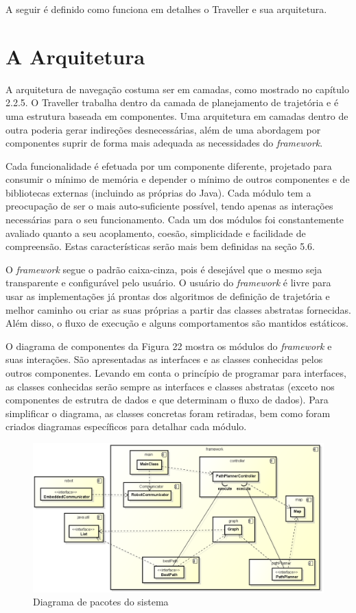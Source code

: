 A seguir é definido como funciona em detalhes o Traveller e sua arquitetura.

\section{A Arquitetura}

A arquitetura de navegação costuma ser em camadas, como mostrado no capítulo 2.2.5. O Traveller trabalha dentro da camada de planejamento de trajetória e é uma estrutura baseada em componentes. Uma arquitetura em camadas dentro de outra poderia gerar indireções desnecessárias, além de uma abordagem por componentes suprir de forma mais adequada as necessidades do \textit{framework}.

Cada funcionalidade é efetuada por um componente diferente, projetado para consumir o mínimo de memória e depender o mínimo de outros componentes e de bibliotecas externas (incluindo as próprias do Java). Cada módulo tem a preocupação de ser o mais auto-suficiente possível, tendo apenas as interações necessárias para o seu funcionamento. Cada um dos módulos foi constantemente avaliado quanto a seu acoplamento, coesão,  simplicidade e facilidade de compreensão. Estas características serão mais bem definidas na seção 5.6.

O \textit{framework} segue o padrão caixa-cinza, pois é desejável que o mesmo seja transparente e configurável pelo usuário. O usuário do \textit{framework} é livre para usar as implementações já prontas dos algoritmos de definição de trajetória e melhor caminho ou criar as suas próprias a partir das classes abstratas fornecidas. Além disso, o fluxo de execução e alguns comportamentos são mantidos estáticos.

O diagrama de componentes da Figura 22 mostra os módulos do \textit{framework} e suas interações. São apresentadas as interfaces e as classes conhecidas pelos outros componentes. Levando em conta o princípio de programar para interfaces, as classes conhecidas serão sempre as interfaces e classes abstratas (exceto nos componentes de estrutra de dados e que determinam o fluxo de dados). Para simplificar o diagrama, as classes concretas foram retiradas, bem como foram criados diagramas específicos para detalhar cada módulo.

\begin{figure}[h]
	\centering
	\label{fig22}
		\includegraphics[keepaspectratio=true,scale=0.5]{figuras/componentes.png}
	\caption{Diagrama de pacotes do sistema}
\end{figure}


